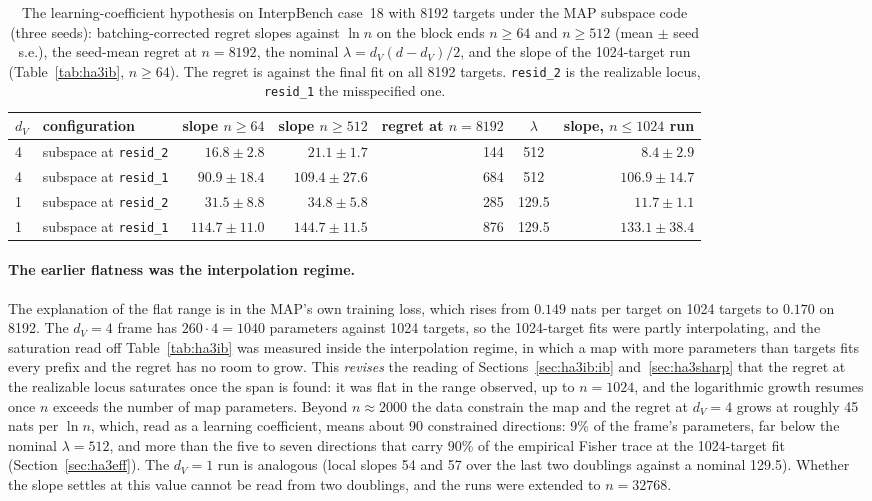 \documentclass[11pt,a4paper]{article}
\newcommand{\dv}{d_V}
\begin{document}
\begin{table}[t]
\centering
\footnotesize
\caption{The learning-coefficient hypothesis on InterpBench case~18 with 8192 targets under the MAP subspace code (three seeds): batching-corrected regret slopes against $\ln n$ on the block ends $n\ge64$ and $n\ge512$ (mean $\pm$ seed s.e.), the seed-mean regret at $n=8192$, the nominal $\lambda=\dv(d-\dv)/2$, and the slope of the 1024-target run (Table~\ref{tab:ha3ib}, $n\ge64$). The regret is against the final fit on all 8192 targets. \texttt{resid\_2} is the realizable locus, \texttt{resid\_1} the misspecified one.}
\label{tab:ha3ib8192}
\begin{tabular}{llrrrcr}
\toprule
$\dv$ & configuration & slope $n\ge64$ & slope $n\ge512$ & regret at $n{=}8192$ & $\lambda$ & slope, $n\le1024$ run \\
\midrule
4 & subspace at \texttt{resid\_2} & $16.8\pm2.8$ & $21.1\pm1.7$ & 144 & 512 & $8.4\pm2.9$ \\
4 & subspace at \texttt{resid\_1} & $90.9\pm18.4$ & $109.4\pm27.6$ & 684 & 512 & $106.9\pm14.7$ \\
\midrule
1 & subspace at \texttt{resid\_2} & $31.5\pm8.8$ & $34.8\pm5.8$ & 285 & 129.5 & $11.7\pm1.1$ \\
1 & subspace at \texttt{resid\_1} & $114.7\pm11.0$ & $144.7\pm11.5$ & 876 & 129.5 & $133.1\pm38.4$ \\
\bottomrule
\end{tabular}
\end{table}

\paragraph{The earlier flatness was the interpolation regime.} The explanation of the flat range is in the MAP's own training loss, which rises from $0.149$ nats per target on 1024 targets to $0.170$ on 8192. The $\dv=4$ frame has $260\cdot4=1040$ parameters against 1024 targets, so the 1024-target fits were partly interpolating, and the saturation read off Table~\ref{tab:ha3ib} was measured inside the interpolation regime, in which a map with more parameters than targets fits every prefix and the regret has no room to grow. This \emph{revises} the reading of Sections~\ref{sec:ha3ib:ib} and~\ref{sec:ha3sharp} that the regret at the realizable locus saturates once the span is found: it was flat in the range observed, up to $n=1024$, and the logarithmic growth resumes once $n$ exceeds the number of map parameters. Beyond $n\approx2000$ the data constrain the map and the regret at $\dv=4$ grows at roughly 45 nats per $\ln n$, which, read as a learning coefficient, means about 90 constrained directions: 9\% of the frame's parameters, far below the nominal $\lambda=512$, and more than the five to seven directions that carry 90\% of the empirical Fisher trace at the 1024-target fit (Section~\ref{sec:ha3eff}). The $\dv=1$ run is analogous (local slopes 54 and 57 over the last two doublings against a nominal 129.5). Whether the slope settles at this value cannot be read from two doublings, and the runs were extended to $n=32768$.
\end{document}
